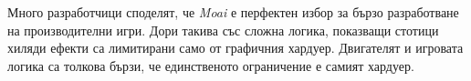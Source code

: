 			Много разработчици споделят, че \emph{Moai} е перфектен избор за бързо разработване на производителни игри.
			Дори такива със сложна логика, показващи стотици хиляди ефекти са лимитирани само от графичния хардуер.
			Двигателят и игровата логика са толкова бързи, че единственото ограничение е самият хардуер. \cite{Zipline}